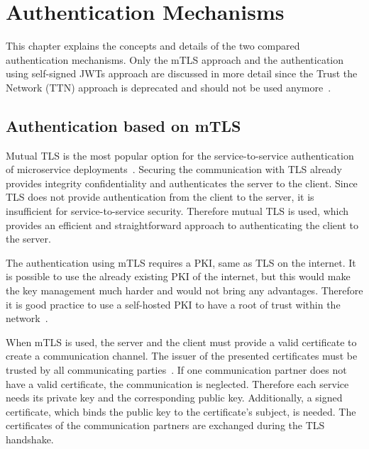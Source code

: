 \chapter{Authentication Mechanisms}
\label{cha:authentication_mechanisms}
This chapter explains the concepts and details of the two compared authentication mechanisms.
Only the mTLS approach and the authentication using self-signed JWTs approach are discussed in more detail since the Trust the Network (TTN) approach is deprecated and should not be used anymore~\cite{dias2020microservices}.


\section{Authentication based on mTLS}
Mutual TLS is the most popular option for the service-to-service authentication of microservice deployments~\cite{dias2020microservices}.
Securing the communication with TLS already provides integrity confidentiality and authenticates the server to the client.
Since TLS does not provide authentication from the client to the server, it is insufficient for service-to-service security.
Therefore mutual TLS is used, which provides an efficient and straightforward approach to authenticating the client to the server.

The authentication using mTLS requires a PKI, same as TLS on the internet.
It is possible to use the already existing PKI of the internet, but this would make the key management much harder and would not bring any advantages.
Therefore it is good practice to use a self-hosted PKI to have a root of trust within the network~\cite{dias2020microservices}.

When mTLS is used, the server and the client must provide a valid certificate to create a communication channel.
The issuer of the presented certificates must be trusted by all communicating parties~\cite{dias2020microservices}.
If one communication partner does not have a valid certificate, the communication is neglected.
Therefore each service needs its private key and the corresponding public key.
Additionally, a signed certificate, which binds the public key to the certificate's subject, is needed.
The certificates of the communication partners are exchanged during the TLS handshake.

